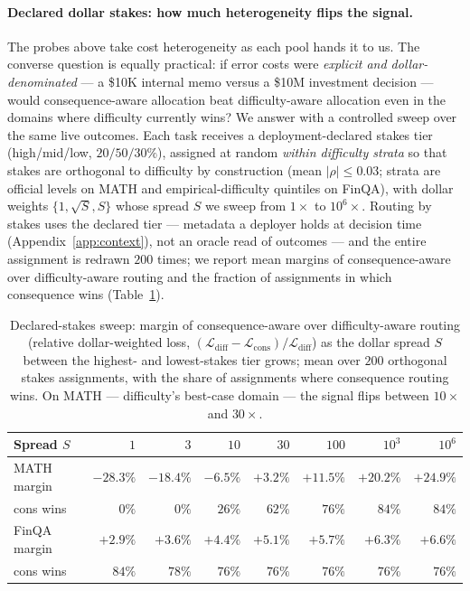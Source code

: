 \documentclass{article}
\begin{document}
\paragraph{Declared dollar stakes: how much heterogeneity flips the
signal.} The probes above take cost heterogeneity as each pool hands
it to us. The converse question is equally practical: if error costs
were \emph{explicit and dollar-denominated} --- a \$10K
internal memo versus a \$10M investment decision --- would
consequence-aware allocation beat difficulty-aware allocation even in
the domains where difficulty currently wins? We answer with a
controlled sweep over the same live outcomes. Each task receives a
deployment-declared stakes tier (high/mid/low, $20/50/30\%$),
assigned at random \emph{within difficulty strata} so that stakes are
orthogonal to difficulty by construction (mean $|\rho| \le 0.03$;
strata are official levels on MATH and empirical-difficulty quintiles
on FinQA), with dollar weights $\{1, \sqrt{S}, S\}$ whose spread $S$
we sweep from $1\times$ to $10^{6}\times$. Routing by stakes uses the
declared tier --- metadata a deployer holds at decision time
(Appendix~\ref{app:context}), not an oracle read of outcomes --- and
the entire assignment is redrawn $200$ times; we report mean margins
of consequence-aware over difficulty-aware routing and the fraction
of assignments in which consequence wins
(Table~\ref{tab:stakescross}).

\begin{table}[t]
\centering
\caption{Declared-stakes sweep: margin of consequence-aware over
difficulty-aware routing (relative dollar-weighted loss,
$(\mathcal{L}_{\mathrm{diff}}-\mathcal{L}_{\mathrm{cons}})/\mathcal{L}_{\mathrm{diff}}$)
as the dollar spread $S$ between the highest- and lowest-stakes tier
grows; mean over $200$ orthogonal stakes assignments, with the share
of assignments where consequence routing wins. On MATH ---
difficulty's best-case domain --- the signal flips between
$10\times$ and $30\times$.}
\label{tab:stakescross}
\small
\begin{tabular}{lrrrrrrr}
\toprule
Spread $S$ & $1$ & $3$ & $10$ & $30$ & $100$ & $10^{3}$ & $10^{6}$ \\
\midrule
MATH margin & $-28.3\%$ & $-18.4\%$ & $-6.5\%$ & $+3.2\%$ & $+11.5\%$ & $+20.2\%$ & $+24.9\%$ \\
\quad cons wins & $0\%$ & $0\%$ & $26\%$ & $62\%$ & $76\%$ & $84\%$ & $84\%$ \\
\addlinespace
FinQA margin & $+2.9\%$ & $+3.6\%$ & $+4.4\%$ & $+5.1\%$ & $+5.7\%$ & $+6.3\%$ & $+6.6\%$ \\
\quad cons wins & $84\%$ & $78\%$ & $76\%$ & $76\%$ & $76\%$ & $76\%$ & $76\%$ \\
\bottomrule
\end{tabular}
\end{table}
\end{document}
